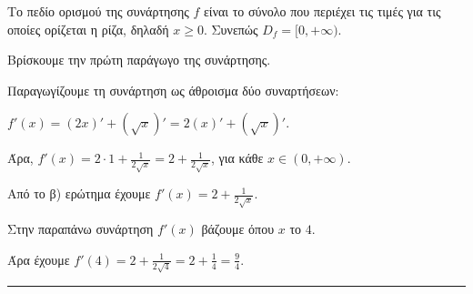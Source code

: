 \begin{alist}
\item Το πεδίο ορισμού της συνάρτησης $f$ είναι το σύνολο που περιέχει τις τιμές για τις οποίες ορίζεται η ρίζα, δηλαδή $x \ge 0$. Συνεπώς $D_f = [0, +\infty)$.

\item Βρίσκουμε την πρώτη παράγωγο της συνάρτησης.

Παραγωγίζουμε τη συνάρτηση ως άθροισμα δύο συναρτήσεων:

$f'(x) = (2x)' + (\sqrt{x})' = 2(x)' + (\sqrt{x})'$.

Άρα, $f'(x) = 2 \cdot 1 + \frac{1}{2\sqrt{x}} = 2 + \frac{1}{2\sqrt{x}}$, για κάθε $x \in (0, +\infty)$.

\item Από το β) ερώτημα έχουμε $f'(x) = 2 + \frac{1}{2\sqrt{x}}$.

Στην παραπάνω συνάρτηση $f'(x)$ βάζουμε όπου $x$ το $4$.

Άρα έχουμε $f'(4) = 2 + \frac{1}{2\sqrt{4}} = 2 + \frac{1}{4} = \frac{9}{4}$.
\end{alist}
\vspace{6mm}
\noindent\rule{\textwidth}{0.4pt}
\vspace{6mm}

